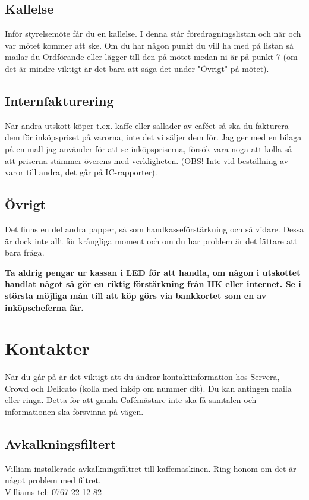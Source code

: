 \documentclass[10pt]{article}
\begin{document}
\subsection{Kallelse}
Inför styrelsemöte får du en kallelse. I denna står föredragningslistan och när och var mötet kommer att ske. Om du har någon punkt du vill ha med på listan så mailar du Ordförande eller lägger till den på mötet medan ni är på punkt 7 (om det är mindre viktigt är det bara att säga det under "Övrigt" på mötet).

\subsection{Internfakturering}
När andra utskott köper t.ex. kaffe eller sallader av caféet så ska du fakturera dem för inköpspriset på varorna, inte det vi säljer dem för. Jag ger med en bilaga på en mall jag använder för att se inköpspriserna, försök vara noga att kolla så att priserna stämmer överens med verkligheten. (OBS! Inte vid beställning av varor till andra, det går på IC-rapporter).

\subsection{Övrigt}
Det finns en del andra papper, så som handkasseförstärkning och så vidare. Dessa är dock inte allt för krångliga moment och om du har problem är det lättare att bara fråga.

\textbf{Ta aldrig pengar ur kassan i LED för att handla, om någon i utskottet handlat något så gör en riktig förstärkning från HK eller internet. Se i största möjliga mån till att köp  görs via bankkortet som en av inköpscheferna får.}

\section{Kontakter}
När du går på är det viktigt att du ändrar kontaktinformation hos Servera, Crowd och Delicato (kolla med inköp om nummer dit). Du kan antingen maila eller ringa. Detta för att gamla Cafémästare inte ska få samtalen och informationen ska försvinna på vägen.

\subsection*{Avkalkningsfiltert}
Villiam installerade avkalkningsfiltret till kaffemaskinen. Ring honom om det är något problem med filtret. \\
Villiams tel: 0767-22 12 82
\end{document}
